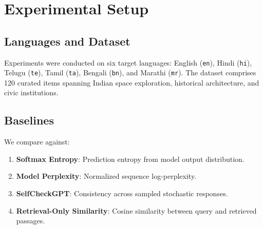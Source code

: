 \section{Experimental Setup}
\subsection{Languages and Dataset}
Experiments were conducted on six target languages: English (\texttt{en}), Hindi (\texttt{hi}), Telugu (\texttt{te}), Tamil (\texttt{ta}), Bengali (\texttt{bn}), and Marathi (\texttt{mr}). The dataset comprises 120 curated items spanning Indian space exploration, historical architecture, and civic institutions.

\subsection{Baselines}
We compare against:
\begin{enumerate}
    \item \textbf{Softmax Entropy}: Prediction entropy from model output distribution.
    \item \textbf{Model Perplexity}: Normalized sequence log-perplexity.
    \item \textbf{SelfCheckGPT}: Consistency across sampled stochastic responses.
    \item \textbf{Retrieval-Only Similarity}: Cosine similarity between query and retrieved passages.
\end{enumerate}

